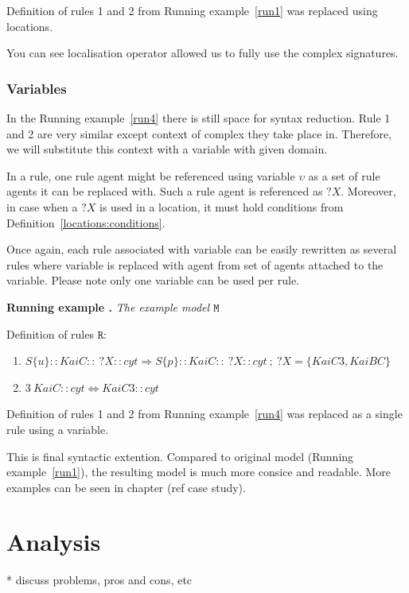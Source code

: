\documentclass[12pt]{fithesis2}
\newcounter{counter}[section]
\renewcommand{\thecounter}{\thesection.\arabic{counter}}
\newenvironment{runningExample}[1]{\bigskip\refstepcounter{counter}\noindent\textbf{Running example \thecounter} \textit{#1} \par\nopagebreak}{\bigskip}
\begin{document}
\noindent Definition of rules 1 and 2 from Running example~\ref{run1} was replaced using locations.

You can see localisation operator allowed us to fully use the complex signatures.

\subsection{Variables}

In the Running example~\ref{run4} there is still space for syntax reduction. Rule 1 and 2 are very similar except context of complex they take place in. Therefore, we will substitute this context with a variable with given domain.

In a rule, one rule agent might be referenced using variable $\upsilon$ as a set of rule agents it can be replaced with. Such a rule agent is referenced as $?X$. Moreover, in case when a $?X$ is used in a location, it must hold conditions from Definition~\ref{locations:conditions}.

Once again, each rule associated with variable can be easily rewritten as several rules where variable is replaced with agent from set of agents attached to the variable. Please note only one variable can be used per rule.

\begin{runningExample}{The example model $\mathtt{M}$}\label{run5}
\noindent Definition of rules $\mathtt{R}$:
{\small
\begin{enumerate}
\item $S\{u\}::KaiC::~?X::cyt \Rightarrow S\{p\}::KaiC::~?X::cyt ~;~ ?X = \{KaiC3, KaiBC\}$
\item $3~KaiC::cyt \Leftrightarrow KaiC3::cyt$
\end{enumerate}
}
\end{runningExample}

\noindent Definition of rules 1 and 2 from Running example~\ref{run4} was replaced as a single rule using a variable.

This is final syntactic extention. Compared to original model (Running example~\ref{run1}), the resulting model is much more consice and readable. More examples can be seen in chapter (ref case study).

\chapter{Analysis}

* discuss problems, pros and cons, etc
\end{document}
